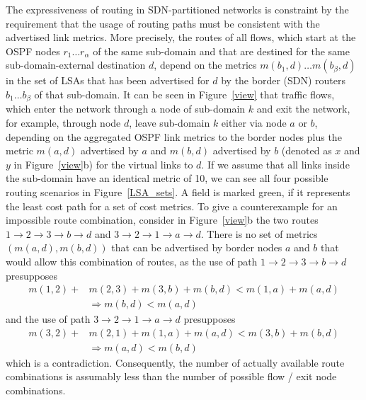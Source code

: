 \documentclass[journal]{IEEEtran}
\begin{document}
\par The expressiveness of routing in SDN-partitioned networks is constraint by the requirement that the usage of routing paths must be consistent with the advertised link metrics. More precisely, the routes of all flows, which start at the OSPF nodes $r_1\ldots r_\alpha$ of the same sub-domain and that are destined for the same sub-domain-external destination $d$, depend on the metrics $m(b_1,d) \ldots m(b_\beta,d)$ in the set of LSAs that has been advertised for $d$ by the border (SDN) routers $b_1\ldots b_\beta$ of that sub-domain. It can be seen in Figure~\ref{view} that traffic flows, which enter the network through a node of sub-domain $k$ and exit the network, for example, through node $d$, leave sub-domain $k$ either via node $a$ or $b$, depending on the aggregated OSPF link metrics to the border nodes plus the metric $m(a,d)$ advertised by $a$ and $m(b,d)$ advertised by $b$ (denoted as $x$ and $y$ in Figure~\ref{view}b) for the virtual links to $d$. If we assume that all links inside the sub-domain have an identical metric of 10, we can see all four possible routing scenarios in Figure~\ref{LSA_sets}. A field is marked green, if it represents the least cost path for a set of cost metrics. To give a counterexample for an impossible route combination, consider in Figure~\ref{view}b the two routes $1\rightarrow 2\rightarrow 3\rightarrow b\rightarrow d$ and $3\rightarrow 2\rightarrow 1\rightarrow a\rightarrow d$. There is no set of metrics $(m(a,d),m(b,d))$ that can be advertised by border nodes $a$ and $b$ that would allow this combination of routes, as the use of path $1\rightarrow 2\rightarrow 3\rightarrow b\rightarrow d$
presupposes
\begin{equation*}
\begin{split}
m(1,2)+ & m(2,3)+m(3,b)+m(b,d)<m(1,a)+m(a,d) \\
& \Rightarrow m(b,d) < m(a,d)
\end{split}
\end{equation*}
and the use of path $3\rightarrow 2\rightarrow 1\rightarrow a\rightarrow d$ presupposes
\begin{equation*}
\begin{split}
m(3,2)+ & m(2,1)+m(1,a)+m(a,d)<m(3,b)+m(b,d) \\
& \Rightarrow m(a,d) < m(b,d)
\end{split}
\end{equation*}
which is a contradiction. Consequently, the number of actually available route combinations is assumably less than the number of possible flow / exit node combinations.
\end{document}
